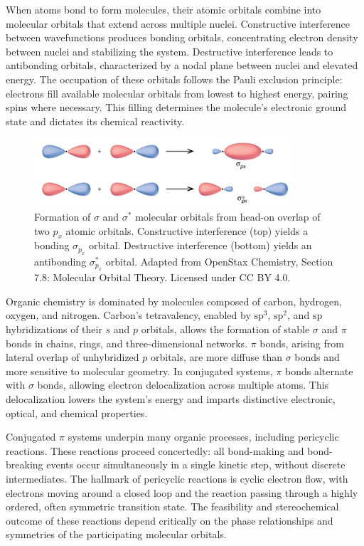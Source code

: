 When atoms bond to form molecules, their atomic orbitals combine into molecular orbitals that extend across multiple nuclei. Constructive interference between wavefunctions produces bonding orbitals, concentrating electron density between nuclei and stabilizing the system. Destructive interference leads to antibonding orbitals, characterized by a nodal plane between nuclei and elevated energy. The occupation of these orbitals follows the Pauli exclusion principle: electrons fill available molecular orbitals from lowest to highest energy, pairing spins where necessary. This filling determines the molecule’s electronic ground state and dictates its chemical reactivity.

\begin{figure}[H]
\centering
\includegraphics[width=0.85\textwidth]{46_WoodwardHoffmannRules/CNX_Chem_08_04_pMOsigma1.jpg}
\caption{Formation of $\sigma$ and $\sigma^*$ molecular orbitals from head-on overlap of two $p_x$ atomic orbitals. Constructive interference (top) yields a bonding $\sigma_{p_x}$ orbital. Destructive interference (bottom) yields an antibonding $\sigma_{p_x}^*$ orbital. Adapted from OpenStax Chemistry, Section 7.8: Molecular Orbital Theory. Licensed under CC BY 4.0.}
\label{fig:sigma_px}
\end{figure}

Organic chemistry is dominated by molecules composed of carbon, hydrogen, oxygen, and nitrogen. Carbon’s tetravalency, enabled by $\mathrm{sp}^3$, $\mathrm{sp}^2$, and $\mathrm{sp}$ hybridizations of their $s$ and $p$ orbitals, allows the formation of stable $\sigma$ and $\pi$ bonds in chains, rings, and three-dimensional networks. $\pi$ bonds, arising from lateral overlap of unhybridized $p$ orbitals, are more diffuse than $\sigma$ bonds and more sensitive to molecular geometry. In conjugated systems, $\pi$ bonds alternate with $\sigma$ bonds, allowing electron delocalization across multiple atoms. This delocalization lowers the system's energy and imparts distinctive electronic, optical, and chemical properties.

Conjugated $\pi$ systems underpin many organic processes, including pericyclic reactions. These reactions proceed concertedly: all bond-making and bond-breaking events occur simultaneously in a single kinetic step, without discrete intermediates. The hallmark of pericyclic reactions is cyclic electron flow, with electrons moving around a closed loop and the reaction passing through a highly ordered, often symmetric transition state. The feasibility and stereochemical outcome of these reactions depend critically on the phase relationships and symmetries of the participating molecular orbitals.

